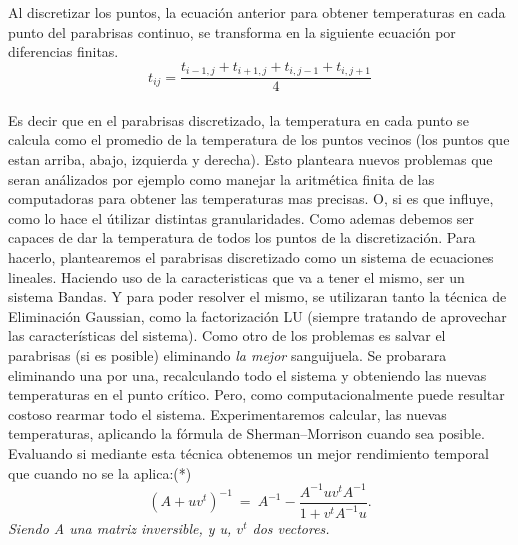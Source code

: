 Al discretizar los puntos, la ecuación anterior para obtener temperaturas en cada punto del parabrisas continuo, se transforma en la siguiente ecuación por diferencias finitas.
\begin{equation}
t_{ij} = \frac{t_{i-1,j} + t_{i+1,j} + t_{i,j-1} + t_{i,j+1}}{4}
\end{equation}\\
Es decir que en el parabrisas discretizado, la temperatura en cada punto se calcula como el promedio de la temperatura de los puntos vecinos (los puntos que estan arriba, abajo, izquierda y derecha).\newline
Esto planteara nuevos problemas que seran análizados por ejemplo como manejar la aritmética finita de las computadoras para obtener las temperaturas mas precisas. O, si es que influye, como lo hace el útilizar distintas granularidades.\newline
Como ademas debemos ser capaces de dar la temperatura de todos los puntos de la discretización. Para hacerlo, plantearemos el parabrisas discretizado como un sistema de ecuaciones lineales. Haciendo uso de la caracteristicas que va a tener el mismo, ser un sistema Bandas. 
 Y para poder resolver el mismo, se utilizaran tanto la técnica de Eliminación Gaussian, como la factorización LU (siempre tratando de aprovechar las características del sistema).\newline
Como otro de los problemas es salvar el parabrisas (si es posible) eliminando \textit{la mejor} sanguijuela. Se probarara eliminando una por una, recalculando todo el sistema y  obteniendo las nuevas temperaturas en el punto crítico. Pero, como computacionalmente puede resultar costoso rearmar todo el sistema. Experimentaremos calcular, las nuevas temperaturas, aplicando la fórmula de Sherman–Morrison cuando sea posible. Evaluando si mediante esta técnica obtenemos un mejor rendimiento temporal que cuando no se la aplica:(*)
\begin{equation}
	(A+ uv^t)^{-1} \ =\ A^{-1} - \frac{ A^{-1} u v^t A^{-1} }{1+v^t A^{-1}u}.\label{eq:sm}
\end{equation} 
\textit{Siendo A una matriz inversible, y u, $v^t$ dos vectores.}   
   

